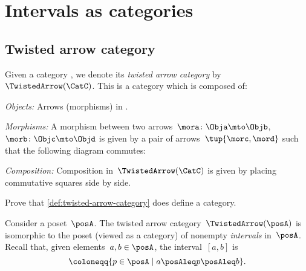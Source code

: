 
\section{Intervals as categories}

\subsection{Twisted arrow category}

\begin{ctdefinition}
    \label{def:twisted-arrow-category}
    \label{def:twisted-arrow}
    Given a category \CatC, we denote its \emph{twisted arrow category} by~$\TwistedArrow(\CatC)$.
    This is a category which is composed of:
    \begin{compactenum}
        \item \emph{Objects:} Arrows (morphisms) in \CatC.
        \item \emph{Morphisms:} A morphism between two arrows~$\mora\colon \Obja \mto \Objb $,~$\morb\colon \Objc \mto \Objd$ is given by a pair of arrows~$\tup{\morc,\mord}$ such that the following diagram commutes:
              \begin{center}
              \end{center}
        \item \emph{Composition:} Composition in~$\TwistedArrow(\CatC)$ is given by placing commutative squares side by side.
    \end{compactenum}
\end{ctdefinition}

\begin{gradedexercise}
    \label{ex:TwistedCat}
    Prove that \cref{def:twisted-arrow-category} does define a category.
\end{gradedexercise}


\begin{example}[Intervals]
    \label{exa:twisted-arrow-poset}
    Consider a poset~$\posA$.
    The twisted arrow category~$\TwistedArrow(\posA)$ is isomorphic to the poset (viewed as a category) of nonempty \emph{intervals} in~$\posA$.
    Recall that, given elements~$a, b \in \posA$, the interval~$[a,b]$ is
    \begin{equation*}
        [a,b]
        \coloneqq \{p \in \posA \mid a\posAleq p \posAleq b\}.
    \end{equation*}
\end{example}

